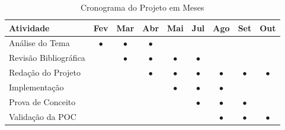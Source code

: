 \documentclass[
	12pt,				    %
	openright,			    %
	oneside,			    %
	a4paper,			    %
    sumario=tradicional,    %
	english,			    %
	brazil,				    %
	]{abntex2}              %
\begin{document}
\begin{table}[htbp]
	\centering
	\caption[Cronograma mensal]{Cronograma do Projeto em Meses}
	\label{tab:cronogramaMensal}
	\begin{tabular}{lcccccccc} %
		\toprule
		\textbf{Atividade}    & \textbf{Fev} & \textbf{Mar} & \textbf{Abr} & \textbf{Mai} & \textbf{Jul} & \textbf{Ago} & \textbf{Set} & \textbf{Out} \\
		\midrule
		Análise do Tema       & $\bullet$    & $\bullet$    & $\bullet$    &              &              &              &              &              \\
		Revisão Bibliográfica &              & $\bullet$    & $\bullet$    & $\bullet$    & $\bullet$    &              &              &              \\
		Redação do Projeto    &              &              & $\bullet$    & $\bullet$    & $\bullet$    & $\bullet$    & $\bullet$    & $\bullet$    \\
		Implementação         &              &              &              & $\bullet$    & $\bullet$    & $\bullet$    &              &              \\
		Prova de Conceito     &              &              &              &              & $\bullet$    & $\bullet$    & $\bullet$    &              \\
		Validação da POC      &              &              &              &              &              & $\bullet$    & $\bullet$    & $\bullet$    \\
		\bottomrule
	\end{tabular}
\end{table}




\end{document}
